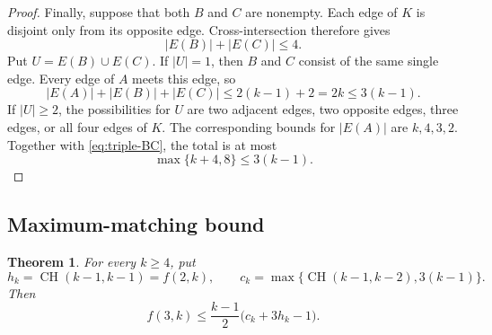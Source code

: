 \documentclass[11pt]{article}
\numberwithin{equation}{section}
\newtheorem{theorem}{Theorem}[section]
\theoremstyle{definition}
\theoremstyle{remark}
\newcommand{\CH}{\operatorname{CH}}
\begin{document}
\begin{proof}
Finally, suppose that both $B$ and $C$ are nonempty. Each edge of $K$ is
disjoint only from its opposite edge. Cross-intersection therefore gives
\begin{equation}
 |E(B)|+|E(C)|\le4.
 \label{eq:triple-BC}
\end{equation}
Put $U=E(B)\cup E(C)$. If $|U|=1$, then $B$ and $C$ consist of the same
single edge. Every edge of $A$ meets this edge, so
\[
 |E(A)|+|E(B)|+|E(C)|
 \le2(k-1)+2=2k\le3(k-1).
\]
If $|U|\ge2$, the possibilities for $U$ are two adjacent edges, two opposite
edges, three edges, or all four edges of $K$. The corresponding bounds for
$|E(A)|$ are $k,4,3,2$. Together with \cref{eq:triple-BC}, the total is at
most
\[
 \max\{k+4,8\}\le3(k-1).
\]
\end{proof}

\subsection{Maximum-matching bound}

\begin{theorem}
\label{thm:triple-general-upper}
For every $k\ge4$, put
\[
 h_k=\CH(k-1,k-1)=f(2,k),
 \qquad
 c_k=\max\{\CH(k-1,k-2),3(k-1)\}.
\]
Then
\begin{equation}
 f(3,k)\le
 \frac{k-1}{2}\bigl(c_k+3h_k-1\bigr).
 \label{eq:triple-general-upper}
\end{equation}
\end{theorem}
\end{document}
